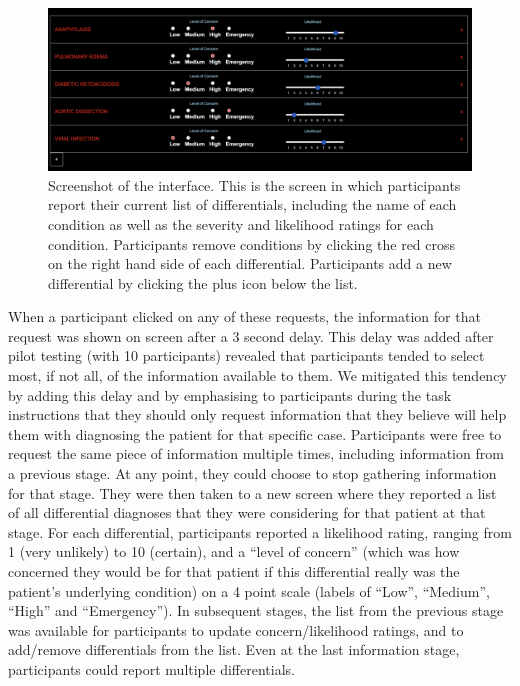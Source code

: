\documentclass[a4paper, nobind]{templates/ociamthesis}
\begin{document}
\begin{figure}[H]

{\centering \includegraphics[width=1\linewidth]{./assets/Screenshot2} 

}

\caption[Online Study: Screenshot 2]{Screenshot of the interface. This is the screen in which participants report their current list of differentials, including the name of each condition as well as the severity and likelihood ratings for each condition. Participants remove conditions by clicking the red cross on the right hand side of each differential. Participants add a new differential by clicking the plus icon below the list.}\label{fig:screenshot2}
\end{figure}

When a participant clicked on any of these requests, the information for that request was shown on screen after a 3 second delay. This delay was added after pilot testing (with 10 participants) revealed that participants tended to select most, if not all, of the information available to them. We mitigated this tendency by adding this delay and by emphasising to participants during the task instructions that they should only request information that they believe will help them with diagnosing the patient for that specific case. Participants were free to request the same piece of information multiple times, including information from a previous stage. At any point, they could choose to stop gathering information for that stage. They were then taken to a new screen where they reported a list of all differential diagnoses that they were considering for that patient at that stage. For each differential, participants reported a likelihood rating, ranging from 1 (very unlikely) to 10 (certain), and a ``level of concern'' (which was how concerned they would be for that patient if this differential really was the patient's underlying condition) on a 4 point scale (labels of ``Low'', ``Medium'', ``High'' and ``Emergency''). In subsequent stages, the list from the previous stage was available for participants to update concern/likelihood ratings, and to add/remove differentials from the list. Even at the last information stage, participants could report multiple differentials.\\
\end{document}
